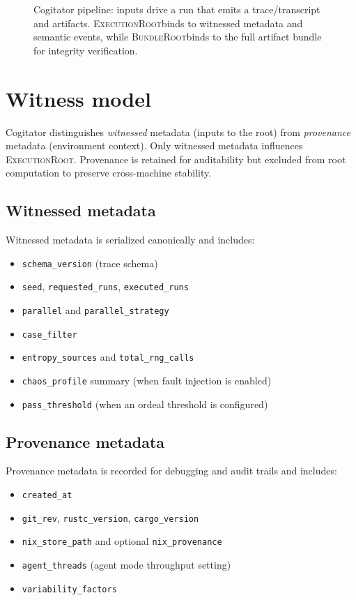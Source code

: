 \documentclass[11pt]{article}
\newcommand{\ExecutionRoot}{\textsc{ExecutionRoot}}
\newcommand{\BundleRoot}{\textsc{BundleRoot}}
\begin{document}
\begin{figure}[t]
  \centering
  
  \caption{Cogitator pipeline: inputs drive a run that emits a trace/transcript and artifacts.
  \ExecutionRoot binds to witnessed metadata and semantic events, while \BundleRoot binds to the
  full artifact bundle for integrity verification.}
  \label{fig:pipeline}
\end{figure}

\section{Witness model}
Cogitator distinguishes \emph{witnessed} metadata (inputs to the root) from
\emph{provenance} metadata (environment context). Only witnessed metadata influences
\ExecutionRoot. Provenance is retained for auditability but excluded from root
computation to preserve cross-machine stability.

\subsection{Witnessed metadata}
Witnessed metadata is serialized canonically and includes:
\begin{itemize}[leftmargin=1.4em]
  \item \texttt{schema\_version} (trace schema)
  \item \texttt{seed}, \texttt{requested\_runs}, \texttt{executed\_runs}
  \item \texttt{parallel} and \texttt{parallel\_strategy}
  \item \texttt{case\_filter}
  \item \texttt{entropy\_sources} and \texttt{total\_rng\_calls}
  \item \texttt{chaos\_profile} summary (when fault injection is enabled)
  \item \texttt{pass\_threshold} (when an ordeal threshold is configured)
\end{itemize}

\subsection{Provenance metadata}
Provenance metadata is recorded for debugging and audit trails and includes:
\begin{itemize}[leftmargin=1.4em]
  \item \texttt{created\_at}
  \item \texttt{git\_rev}, \texttt{rustc\_version}, \texttt{cargo\_version}
  \item \texttt{nix\_store\_path} and optional \texttt{nix\_provenance}
  \item \texttt{agent\_threads} (agent mode throughput setting)
  \item \texttt{variability\_factors}
\end{itemize}
\end{document}
